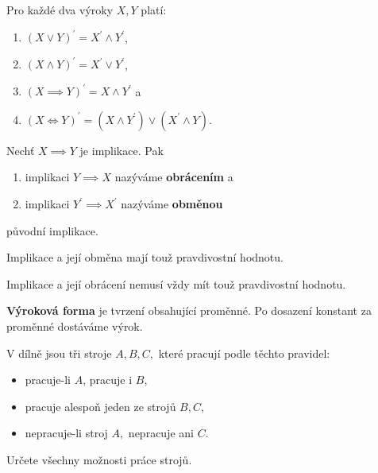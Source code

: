 \begin{veta}
  Pro každé dva výroky $X,Y$ platí:
  \begin{enumerate}[$i.$]
    \item $(X\lor Y)^\prime = X^\prime \land Y^\prime$,
    \item $(X\land Y)^\prime = X^\prime \lor Y^\prime$,
    \item $(X\implies Y)^\prime = X\land Y^\prime$ a
    \item $(X\iff Y)^\prime = (X\land Y^\prime) \lor (X^\prime \land Y)$.
  \end{enumerate}
\end{veta}

\begin{definition}
  Nechť $X\implies Y$ je implikace. Pak
  \begin{enumerate}[$i.$]
    \item implikaci $Y\implies X$ nazýváme \textbf{obrácením} a
    \item implikaci $Y^\prime \implies X^\prime$ nazýváme \textbf{obměnou}
  \end{enumerate}
  původní implikace.
\end{definition}

\begin{veta}
  Implikace a její obměna mají touž pravdivostní hodnotu.
\end{veta}

\begin{pozn}
  Implikace a její obrácení nemusí vždy mít touž pravdivostní hodnotu.
\end{pozn}

\begin{definition}
  \textbf{Výroková forma} je tvrzení obsahující proměnné. Po dosazení konstant za proměnné dostáváme výrok.
\end{definition}

\begin{priklad}
    V dílně jsou tři stroje $A,B,C,$ které pracují podle těchto pravidel:
    \begin{itemize}
    \item pracuje-li $A$, pracuje i $B$,
   	\item pracuje alespoň jeden ze strojů $B,C$,
   	\item nepracuje-li stroj $A,$ nepracuje ani $C.$
    \end{itemize}
    Určete všechny možnosti práce strojů.
\end{priklad}

